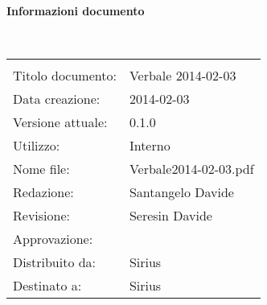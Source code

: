 \noindent\begin{Large}\textbf{Informazioni documento}\end{Large}\\
\begin{center}
\begin{tabular}{ll}
\hline\\
Titolo documento: & Verbale 2014-02-03\\
Data creazione: & 2014-02-03\\
Versione attuale: & 0.1.0\\
Utilizzo: & Interno\\
Nome file:& Verbale2014-02-03.pdf\\
Redazione: & Santangelo Davide\\
Revisione: & Seresin Davide\\
Approvazione: & \\
Distribuito da:& Sirius\\
Destinato a: & Sirius\\
\end{tabular}
\end{center}

